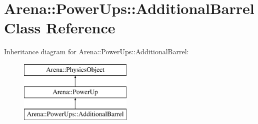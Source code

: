 \hypertarget{class_arena_1_1_power_ups_1_1_additional_barrel}{\section{Arena\+:\+:Power\+Ups\+:\+:Additional\+Barrel Class Reference}
\label{class_arena_1_1_power_ups_1_1_additional_barrel}
}
Inheritance diagram for Arena\+:\+:Power\+Ups\+:\+:Additional\+Barrel\+:\begin{figure}[H]
\begin{center}
\leavevmode
\includegraphics[height=3.000000cm]{class_arena_1_1_power_ups_1_1_additional_barrel}
\end{center}
\end{figure}
